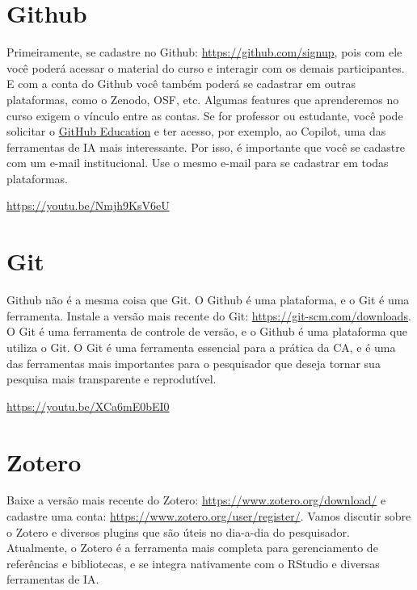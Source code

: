 \documentclass[
  a4paper,
]{book}
\begin{document}
\section*{Github}\label{sec-githubprework}


Primeiramente, se cadastre no Github: \url{https://github.com/signup},
pois com ele você poderá acessar o material do curso e interagir com os
demais participantes. E com a conta do Github você também poderá se
cadastrar em outras plataformas, como o Zenodo, OSF, etc. Algumas
features que aprenderemos no curso exigem o vínculo entre as contas. Se
for professor ou estudante, você pode solicitar o
\href{https://education.github.com/}{GitHub Education} e ter acesso, por
exemplo, ao Copilot, uma das ferramentas de IA mais interessante. Por
isso, é importante que você se cadastre com um e-mail institucional. Use
o mesmo e-mail para se cadastrar em todas plataformas.

\url{https://youtu.be/Nmjh9KsV6eU}

\section*{Git}\label{sec-gitprework}


Github não é a mesma coisa que Git. O Github é uma plataforma, e o Git é
uma ferramenta. Instale a versão mais recente do Git:
\url{https://git-scm.com/downloads}. O Git é uma ferramenta de controle
de versão, e o Github é uma plataforma que utiliza o Git. O Git é uma
ferramenta essencial para a prática da CA, e é uma das ferramentas mais
importantes para o pesquisador que deseja tornar sua pesquisa mais
transparente e reprodutível.

\url{https://youtu.be/XCa6mE0bEI0}

\section*{Zotero}\label{sec-zoteroprework}


Baixe a versão mais recente do Zotero:
\url{https://www.zotero.org/download/} e cadastre uma conta:
\url{https://www.zotero.org/user/register/}. Vamos discutir sobre o
Zotero e diversos plugins que são úteis no dia-a-dia do pesquisador.
Atualmente, o Zotero é a ferramenta mais completa para gerenciamento de
referências e bibliotecas, e se integra nativamente com o RStudio e
diversas ferramentas de IA.
\end{document}
